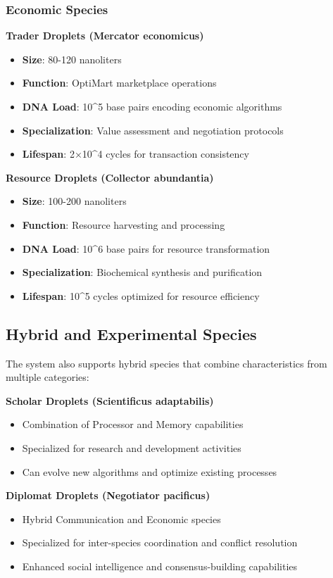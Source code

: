 \documentclass[11pt,a4paper]{article}
\begin{document}
\subsubsection{Economic Species}

\textbf{Trader Droplets (Mercator economicus)}
\begin{itemize}
    \item \textbf{Size}: 80-120 nanoliters
    \item \textbf{Function}: OptiMart marketplace operations
    \item \textbf{DNA Load}: 10\^{}5 base pairs encoding economic algorithms
    \item \textbf{Specialization}: Value assessment and negotiation protocols
    \item \textbf{Lifespan}: 2×10\^{}4 cycles for transaction consistency
\end{itemize}

\textbf{Resource Droplets (Collector abundantia)}
\begin{itemize}
    \item \textbf{Size}: 100-200 nanoliters
    \item \textbf{Function}: Resource harvesting and processing
    \item \textbf{DNA Load}: 10\^{}6 base pairs for resource transformation
    \item \textbf{Specialization}: Biochemical synthesis and purification
    \item \textbf{Lifespan}: 10\^{}5 cycles optimized for resource efficiency
\end{itemize}

\subsection{Hybrid and Experimental Species}

The system also supports hybrid species that combine characteristics from multiple categories:

\textbf{Scholar Droplets (Scientificus adaptabilis)}
\begin{itemize}
    \item Combination of Processor and Memory capabilities
    \item Specialized for research and development activities
    \item Can evolve new algorithms and optimize existing processes
\end{itemize}

\textbf{Diplomat Droplets (Negotiator pacificus)}
\begin{itemize}
    \item Hybrid Communication and Economic species
    \item Specialized for inter-species coordination and conflict resolution
    \item Enhanced social intelligence and consensus-building capabilities
\end{itemize}
\end{document}

